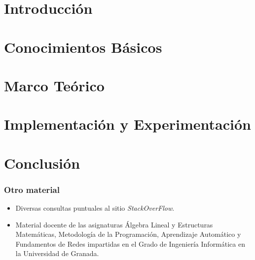 \documentclass[a4paper,11pt]{book}
\begin{document}


\frontmatter
\tableofcontents
\cleardoublepage
{}
{}
\listoffigures
\cleardoublepage
{}
{}
\listoftables
\mainmatter

\part{Introducción}


\part{Conocimientos Básicos}

%



\part{Marco Teórico}


\part{Implementación y Experimentación}



\part{Conclusión}

%
%
%
%
%
\cleardoublepage
{}
{}


\section*{Otro material}
\begin{itemize}
  \item Diversas consultas puntuales al sitio \emph{StackOverFlow}.
  \item Material docente de las asignaturas Álgebra Lineal y Estructuras Matemáticas, Metodología de la Programación, Aprendizaje Automático y Fundamentos de Redes impartidas en el Grado de Ingeniería Informática en la Universidad de Granada.
\end{itemize}
\end{document}

